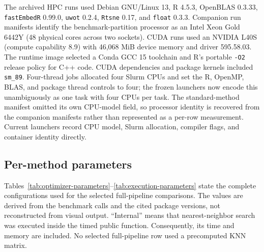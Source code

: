 \documentclass[twoside,11pt]{article}
\newcommand{\pkg}{\texttt{fastEmbedR}}
\begin{document}
The archived HPC runs used Debian GNU/Linux 13, R 4.5.3, OpenBLAS 0.3.33, \pkg{} 0.99.0, \texttt{uwot} 0.2.4, \texttt{Rtsne} 0.17, and \texttt{float} 0.3.3. Companion run manifests identify the benchmark-partition processor as an Intel Xeon Gold 6442Y (48 physical cores across two sockets). CUDA runs used an NVIDIA L40S (compute capability 8.9) with 46,068 MiB device memory and driver 595.58.03. The runtime image selected a Conda GCC 15 toolchain and R's portable \texttt{-O2} release policy for C++ code. CUDA dependencies and package kernels included \texttt{sm\_89}. Four-thread jobs allocated four Slurm CPUs and set the R, OpenMP, BLAS, and package thread controls to four; the frozen launchers now encode this unambiguously as one task with four CPUs per task. The standard-method manifest omitted its own CPU-model field, so processor identity is recovered from the companion manifests rather than represented as a per-row measurement. Current launchers record CPU model, Slurm allocation, compiler flags, and container identity directly.

\subsection{Per-method parameters}

Tables~\ref{tab:optimizer-parameters}--\ref{tab:execution-parameters} state
the complete configurations used for the selected full-pipeline comparisons.
The values are derived from the benchmark calls and the cited package versions,
not reconstructed from visual output. ``Internal'' means that nearest-neighbor search
was executed inside the timed public function. Consequently, its time and
memory are included. No selected full-pipeline row used a precomputed KNN
matrix.
\end{document}
